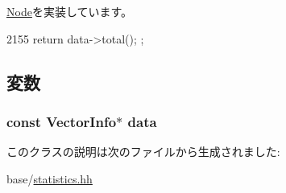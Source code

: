 \hyperlink{classStats_1_1Node_ab152b7e89b37a7db03b04d500ceb8349}{Node}を実装しています。


\begin{DoxyCode}
2155 { return data->total(); };
\end{DoxyCode}


\subsection{変数}
\hypertarget{classStats_1_1VectorStatNode_a98008fa38e5a02bb16056a1b7579660e}{
\subsubsection[{data}]{\setlength{\rightskip}{0pt plus 5cm}const {\bf VectorInfo}$\ast$ {\bf data}}}
\label{classStats_1_1VectorStatNode_a98008fa38e5a02bb16056a1b7579660e}


このクラスの説明は次のファイルから生成されました:\begin{DoxyCompactItemize}
\item 
base/\hyperlink{statistics_8hh}{statistics.hh}\end{DoxyCompactItemize}
